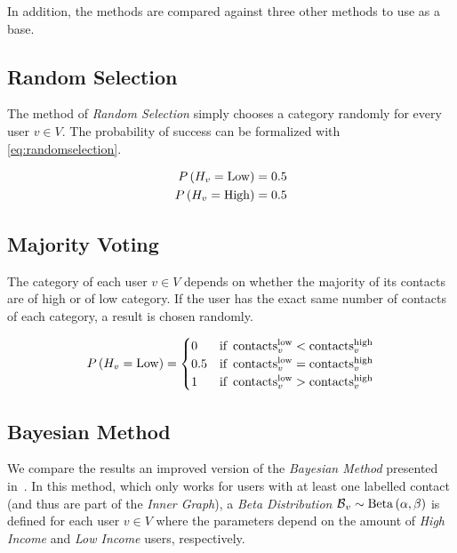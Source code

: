 In addition, the methods are compared against three other methods to use as a base.

\subsection{Random Selection}

The method of \emph{Random Selection} simply chooses a category randomly for every user $v \in V$. The probability of success can be formalized with \cref{eq:randomselection}.

\begin{equation}
\label{eq:randomselection}
\begin{aligned}
	P \left( H_v = \operatorname{Low} \right) &= 0.5 \\
	P \left( H_v = \operatorname{High} \right) &= 0.5
\end{aligned}
\end{equation}

\subsection{Majority Voting}

The category of each user $v \in V$ depends on whether the majority of its contacts are of high or of low category. If the user has the exact same number of contacts of each category, a result is chosen randomly.

\begin{equation}
\label{eq:majorityvoting}
	P \left( H_v = \operatorname{Low} \right) =
	\begin{cases}
		0 & \text{if} \ \operatorname{contacts}^{\operatorname{low}}_v < \operatorname{contacts}^{\operatorname{high}}_v \\
		0.5 & \text{if} \ \operatorname{contacts}^{\operatorname{low}}_v = \operatorname{contacts}^{\operatorname{high}}_v \\
		1 & \text{if} \ \operatorname{contacts}^{\operatorname{low}}_v > \operatorname{contacts}^{\operatorname{high}}_v
	\end{cases}
\end{equation}

\subsection{Bayesian Method}

We compare the results an improved version of the \emph{Bayesian Method} presented in~\cite{fixmanasonam2016}. In this method, which only works for users with at least one labelled contact (and thus are part of the \emph{Inner Graph}), a \emph{Beta Distribution} $\operatorname{\mathcal{B}}_v \sim \operatorname{Beta} \left( \alpha, \beta \right)$ is defined for each user $v \in V$ where the parameters depend on the amount of \emph{High Income} and \emph{Low Income} users, respectively.

